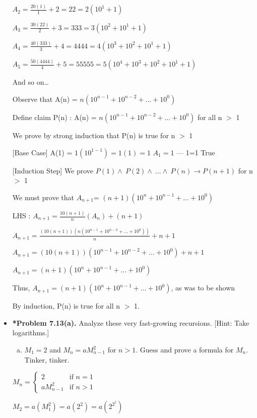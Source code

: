 \documentclass[11pt]{article}
\def\imp{\rightarrow}
\begin{document}
\begin{itemize}
$A_2 = \frac{20(1)}{1} + 2 = 22 = 2(10^1 + 1)$

$A_3 = \frac{30(22)}{2} + 3 = 333 = 3(10^2 + 10^1+ 1)$

$A_4 = \frac{40(333)}{3} + 4 = 4444 = 4(10^3 + 10^2 + 10^1 + 1)$

$A_5 = \frac{50(4444)}{4} + 5 = 55555 = 5(10^4 + 10^3 + 10^2 + 10^1 + 1)$

And so on\dots

Observe that A(n) = $n(10^{n-1} + 10^{n-2} + ... + 10^0)$

Define claim P(n) : A(n) = $n(10^{n-1} + 10^{n-2} + ...+ 10^0)$ for all n $>$ 1

We prove by strong induction that P(n) is true for n $>$ 1

[Base Case] A(1) = $1(10^{1-1}) = 1(1) = 1$ $A_1 = 1$ --- 1=1 True

[Induction Step] We prove $P(1) \land\ P(2) \land\ ... \land\ P(n) \imp P(n+1) $ for n $>$ 1

We must prove that $A_{n+1}$= $(n + 1)(10^{n} + 10^{n-1} + ... + 10^0)$

LHS : $A_{n+1} = \frac{10(n+1)}{n}(A_n)+ (n + 1)$

$A_{n+1} = \frac{(10(n+1))(n(10^{n-1} + 10^{n-2} + ...+ 10^0))}{n} + n + 1$

$A_{n+1} = (10(n+1))(10^{n-1} + 10^{n-2} + ...+ 10^0) + n + 1$

$A_{n+1} = (n+1)(10^{n} + 10^{n-1} + ...+ 10^0)$

Thus, $A_{n+1} = (n+1)(10^{n} + 10^{n-1} + ...+ 10^0)$, as was to be shown

By induction, P(n) is true for all n $>$ 1.

\vspace{0.1in}

\item \textbf{*Problem 7.13(a).}
Analyze these very fast-growing recursions.
[Hint: Take logarithms.]
\begin{enumerate}[(a)]
\item $M_1=2$ and $M_n=aM_{n-1}^2$ for $n>1$.
Guess and prove a formula for $M_n$.
Tinker, tinker.
\end{enumerate}

$ M_n = 
\begin{cases}
  2 & \text{if } n = 1 \\
  aM_{n-1}^2 & \text{if } n > 1
\end{cases}
$

$M_2 = a(M_1^2) = a(2^2) = a(2^{2^1})$


\end{itemize}
\end{document}
